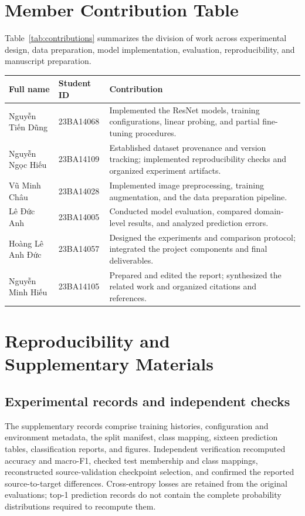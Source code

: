 \documentclass[10pt,a4paper]{article}
\begin{document}
\clearpage
\appendix
\section{Member Contribution Table}
Table~\ref{tab:contributions} summarizes the division of work across experimental design, data preparation, model implementation, evaluation, reproducibility, and manuscript preparation.

\begin{center}
\begingroup
\renewcommand{\arraystretch}{1.2}
\begin{tabularx}{\linewidth}{p{4.1cm}p{2.1cm}X}
\toprule
Full name & Student ID & Contribution\\
\midrule
Nguyễn Tiến Dũng &23BA14068&Implemented the ResNet models, training configurations, linear probing, and partial fine-tuning procedures.\\
Nguyễn Ngọc Hiếu &23BA14109&Established dataset provenance and version tracking; implemented reproducibility checks and organized experiment artifacts.\\
Vũ Minh Châu &23BA14028&Implemented image preprocessing, training augmentation, and the data preparation pipeline.\\
Lê Đức Anh &23BA14005&Conducted model evaluation, compared domain-level results, and analyzed prediction errors.\\
Hoàng Lê Anh Đức &23BA14057&Designed the experiments and comparison protocol; integrated the project components and final deliverables.\\
Nguyễn Minh Hiếu &23BA14105&Prepared and edited the report; synthesized the related work and organized citations and references.\\
\bottomrule
\end{tabularx}
\endgroup
{}\label{tab:contributions}
\end{center}

\section{Reproducibility and Supplementary Materials}
\subsection{Experimental records and independent checks}
The supplementary records comprise training histories, configuration and environment metadata, the split manifest, class mapping, sixteen prediction tables, classification reports, and figures. Independent verification recomputed accuracy and macro-F1, checked test membership and class mappings, reconstructed source-validation checkpoint selection, and confirmed the reported source-to-target differences. Cross-entropy losses are retained from the original evaluations; top-1 prediction records do not contain the complete probability distributions required to recompute them.
\end{document}
